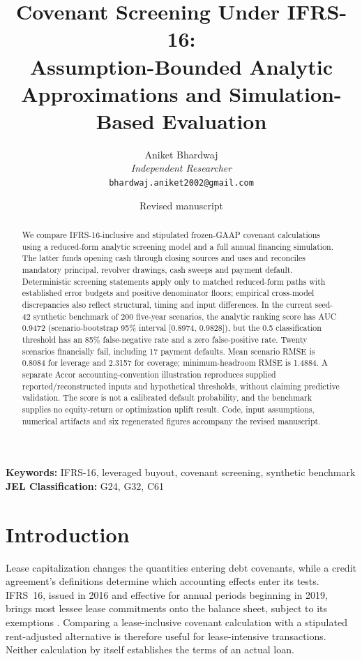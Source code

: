 \documentclass[11pt,a4paper]{article}
\title{Covenant Screening Under IFRS-16: \\
Assumption-Bounded Analytic Approximations and Simulation-Based Evaluation}
\author{
Aniket Bhardwaj\\
\textit{Independent Researcher}\\
\texttt{bhardwaj.aniket2002@gmail.com}
}
\date{Revised manuscript}
\theoremstyle{plain}
\theoremstyle{definition}
\begin{document}
\maketitle
\begin{abstract}
We compare IFRS-16-inclusive and stipulated frozen-GAAP covenant calculations
using a reduced-form analytic screening model and a full annual financing
simulation. The latter funds opening cash through closing sources and uses and
reconciles mandatory principal, revolver drawings, cash sweeps and payment
default. Deterministic screening statements apply only to matched reduced-form
paths with established error budgets and positive denominator floors; empirical
cross-model discrepancies also reflect structural, timing and input differences.
In the current seed-42 synthetic benchmark of 200 five-year scenarios, the
analytic ranking score has AUC 0.9472 (scenario-bootstrap 95\% interval
[0.8974, 0.9828]), but the 0.5 classification threshold has an 85\% false-negative
rate and a zero false-positive rate. Twenty scenarios financially fail, including
17 payment defaults. Mean scenario RMSE is 0.8084 for leverage and 2.3157 for
coverage; minimum-headroom RMSE is 1.4884. A separate Accor accounting-convention
illustration reproduces supplied reported/reconstructed inputs and hypothetical
thresholds, without claiming predictive validation. The score is not a calibrated
default probability, and the benchmark supplies no equity-return or optimization
uplift result. Code, input assumptions, numerical artifacts and six regenerated
figures accompany the revised manuscript.
\end{abstract}

\textbf{Keywords:} IFRS-16, leveraged buyout, covenant screening, synthetic benchmark\\
\textbf{JEL Classification:} G24, G32, C61

\section{Introduction}
Lease capitalization changes the quantities entering debt covenants, while a credit
agreement's definitions determine which accounting effects enter its tests. IFRS~16,
issued in 2016 and effective for annual periods beginning in 2019, brings most lessee
lease commitments onto the balance sheet, subject to its exemptions
\citep{ifrs2016leases}. Comparing a lease-inclusive covenant calculation with a
stipulated rent-adjusted alternative is therefore useful for lease-intensive
transactions. Neither calculation by itself establishes the terms of an actual loan.
\end{document}

